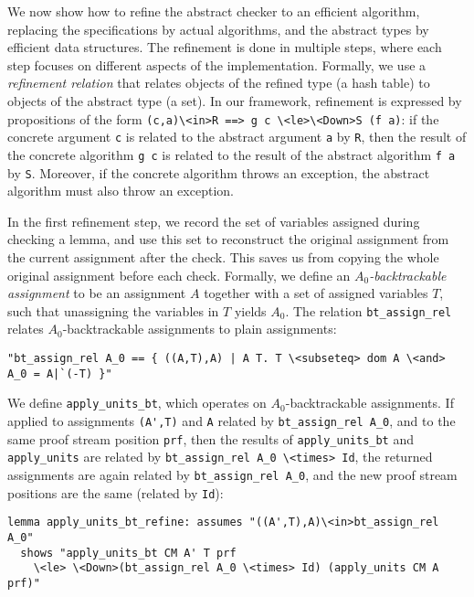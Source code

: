 \documentclass[smallcondensed]{svjour3}     %
\newcommand{\isai}{\lstinline[language=isabelle,basicstyle=\normalsize\ttfamily\slshape]}
\begin{document}
We now show how to refine the abstract checker to an efficient algorithm, replacing the specifications by actual algorithms,
and the abstract types by efficient data structures.
The refinement is done in multiple steps, where each step focuses on different aspects of the implementation. 
Formally, we use a \emph{refinement relation} that relates objects of the refined type (\eg a hash table) to 
objects of the abstract type (\eg a set). In our framework, refinement is expressed 
by propositions of the form \isai{(c,a)\<in>R ==> g c \<le>\<Down>S (f a)}: if the concrete argument \isai$c$ is related to the abstract argument \isai$a$ by \isai$R$, then the result of the concrete
algorithm \isai$g c$ is related to the result of the abstract algorithm \isai$f a$ by \isai$S$. Moreover, if the concrete algorithm throws an exception, 
the abstract algorithm must also throw an exception.

In the first refinement step, we record the set of variables assigned during checking a lemma, 
and use this set to reconstruct the original assignment from the current assignment after the check. 
This saves us from copying the whole original assignment before each check.
Formally, we define an \emph{$A_0$-backtrackable assignment} to be an assignment $A$ together with a set of assigned variables $T$, such that
unassigning the variables in $T$ yields $A_0$. The relation \isai{bt_assign_rel} relates $A_0$-backtrackable assignments to plain assignments:
\begin{lstlisting}
"bt_assign_rel A_0 == { ((A,T),A) | A T. T \<subseteq> dom A \<and> A_0 = A|`(-T) }"
\end{lstlisting}
We define \isai{apply_units_bt}, which operates on $A_0$-backtrackable assignments. If applied 
to assignments \isai$(A',T)$ and \isai$A$ related by \isai{bt_assign_rel A_0}, and to the same proof stream position \isai$prf$, then the results of 
\isai{apply_units_bt} and \isai{apply_units} are related by \isai{bt_assign_rel A_0 \<times> Id}, \ie the returned assignments 
are again related by \isai{bt_assign_rel A_0}, and the new proof stream positions are the same (related by \isai{Id}):
\begin{lstlisting}
lemma apply_units_bt_refine: assumes "((A',T),A)\<in>bt_assign_rel A_0"
  shows "apply_units_bt CM A' T prf 
    \<le> \<Down>(bt_assign_rel A_0 \<times> Id) (apply_units CM A prf)"
\end{lstlisting}
\end{document}
